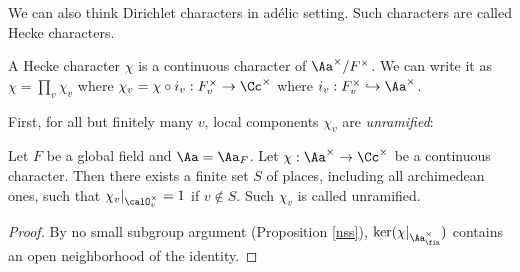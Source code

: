 We can also think Dirichlet characters in ad\'elic setting. Such characters are called Hecke characters.
\begin{definition}
A Hecke character $\chi$ is a continuous character of $\Aa^{\times}/F^{\times}$. 
We can write it as $\chi = \prod_{v}\chi_{v}$ where $\chi_{v} =  \chi \circ i_{v}: F_{v}^{\times} \to \Cc^{\times}$ where $i_{v} : F_{v}^{\times} \hookrightarrow \Aa^{\times}$. 
\end{definition}
First, for all but finitely many $v$, local components $\chi_{v}$ are \emph{unramified}:
\begin{proposition}
Let $F$ be a global field and $\Aa = \Aa_F$. Let $\chi:\Aa^{\times}\to \Cc^{\times}$ be a continuous character. 
Then there exists a finite set $S$ of places, including all archimedean ones, such that $\chi_{v}|_{\calO_{v}^{\times}} = 1$ if $v\not\in S$. Such $\chi_{v}$ is called unramified.
\end{proposition}
\begin{proof}
By no small subgroup argument (Proposition \ref{nss}), $\ker (\chi|_{\Aa_{\fin}^{\times}})$ contains an open neighborhood of the identity. 
\end{proof}

